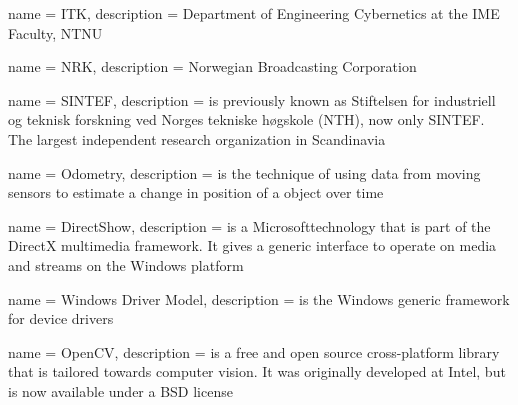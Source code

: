 



{
	name		= {ITK},
	description = {Department of Engineering Cybernetics at the IME Faculty, NTNU}
}

{
	name		= {NRK},
	description = {Norwegian Broadcasting Corporation}
}

{
	name		= {SINTEF},
	description = {is previously known as Stiftelsen for industriell og teknisk forskning ved Norges tekniske høgskole (NTH), now only SINTEF. The largest independent research organization in Scandinavia}
}

{
	name		= {Odometry},
	description	= {is the technique of using data from moving sensors to estimate a change in position of a object over time}
}

{
	name		= {DirectShow},
	description = {is a Microsoft\texttrademark technology that is part of the DirectX multimedia framework. 
					It gives a generic interface to operate on media and streams on the Windows platform}
}

{
	name		= {Windows Driver Model},
	description = {is the Windows generic framework for device drivers}
}

{
	name		= {OpenCV},
	description = {is a free and open source cross-platform library that is tailored towards computer vision. It was originally developed at Intel, but is 
					now available under a BSD license}
}

